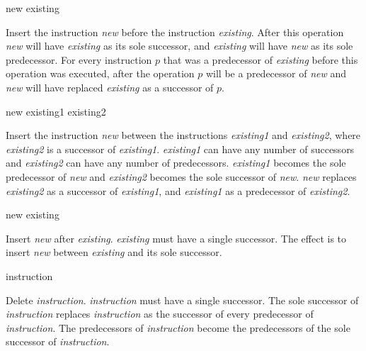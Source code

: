  {new existing}

Insert the instruction \textit{new} before the instruction
\textit{existing}.  After this operation \textit{new} will have
\textit{existing} as its sole successor, and \textit{existing} will
have \textit{new} as its sole predecessor.  For every instruction $p$
that was a predecessor of \textit{existing} before this operation was
executed, after the operation $p$ will be a predecessor of
\textit{new} and \textit{new} will have replaced \textit{existing} as
a successor of $p$.

 {new existing1 existing2}

Insert the instruction \textit{new} between the instructions
\textit{existing1} and \textit{existing2}, where \textit{existing2} is
a successor of \textit{existing1}.  \textit{existing1} can have any
number of successors and \textit{existing2} can have any number of
predecessors.  \textit{existing1} becomes the sole predecessor of
\textit{new} and \textit{existing2} becomes the sole successor of
\textit{new}.  \textit{new} replaces \textit{existing2} as a successor
of \textit{existing1}, and \textit{existing1} as a predecessor of
\textit{existing2}.

 {new existing}

Insert \textit{new} after \textit{existing}.  \textit{existing} must
have a single successor.  The effect is to insert \textit{new} between
\textit{existing} and its sole successor.

 {instruction}

Delete \textit{instruction}.  \textit{instruction} must have a single
successor.  The sole successor of \textit{instruction} replaces
\textit{instruction} as the successor of every predecessor of
\textit{instruction}.  The predecessors of \textit{instruction} become
the predecessors of the sole successor of \textit{instruction}.

